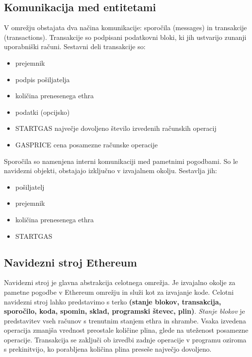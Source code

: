 \documentclass[a4paper, 12pt]{book}
\begin{document}
\subsection{Komunikacija med entitetami}
V omrežju obstajata dva načina komunikacije: sporočila (messages) in transakcije (transactions).
Transakcije so podpisani podatkovni bloki, ki jih ustvarijo zunanji uporabniški računi.
Sestavni deli transakcije so:
\begin{itemize}
	\item prejemnik
	\item podpis pošiljatelja
	\item količina prenesenega ethra
	\item podatki (opcijsko)
	\item STARTGAS največje dovoljeno število izvedenih računskih operacij
	\item GASPRICE cena posamezne računske operacije
\end{itemize}

Sporočila so namenjena interni komunikaciji med pametnimi pogodbami.
So le navidezni objekti, obstajajo izključno v izvajalnem okolju.
Sestavlja jih:
\begin{itemize}
	\item pošiljatelj
	\item prejemnik
	\item količina prenesenega ethra
	\item STARTGAS
\end{itemize}
\cite{ethereumWhitepaper}

\subsection{Navidezni stroj Ethereum}

Navidezni stroj je glavna abstrakcija celotnega omrežja.
Je izvajalno okolje za pametne pogodbe v Ethereum omrežju in služi kot  za izvajanje kode.
Celotni navidezni stroj lahko predstavimo s terko \textbf{(stanje blokov, transakcija, sporočilo, koda, spomin, sklad, programski števec, plin)}.
\textit{Stanje blokov} je predstavitev vseh računov s trenutnim stanjem ethra in shrambe.
Vsaka izvedena operacija zmanjša vrednost preostale količine plina, glede na uteženost posamezne operacije.
Transakcija se zaključi ob izvedbi zadnje operacije v programu oziroma s prekinitvijo, ko porabljena količina plina preseše največjo dovoljeno.
\end{document}
